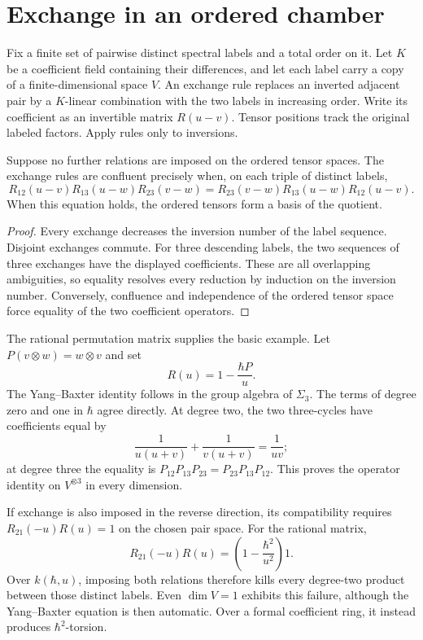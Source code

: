 \section{Exchange in an ordered chamber}

Fix a finite set of pairwise distinct spectral labels and a total order on it.
Let $K$ be a coefficient field containing their differences, and let each label carry a copy of a finite-dimensional space $V$.
An exchange rule replaces an inverted adjacent pair by a $K$-linear combination with the two labels in increasing order.
Write its coefficient as an invertible matrix $R(u-v)$. Tensor positions track the original labeled factors.
Apply rules only to inversions.

\begin{proposition}
\label{prop:alg-exchange}
Suppose no further relations are imposed on the ordered tensor spaces.
The exchange rules are confluent precisely when, on each triple of distinct labels,
\[
 R_{12}(u-v)R_{13}(u-w)R_{23}(v-w)
 =R_{23}(v-w)R_{13}(u-w)R_{12}(u-v).
\]
When this equation holds, the ordered tensors form a basis of the quotient.
\end{proposition}
\begin{proof}
Every exchange decreases the inversion number of the label sequence.
Disjoint exchanges commute.
For three descending labels, the two sequences of three exchanges have the displayed coefficients.
These are all overlapping ambiguities, so equality resolves every reduction by induction on the inversion number.
Conversely, confluence and independence of the ordered tensor space force equality of the two coefficient operators.
\end{proof}

The rational permutation matrix supplies the basic example.
Let $P(v\otimes w)=w\otimes v$ and set
\[
 R(u)=1-\frac{\hbar P}{u}.
\]
The Yang--Baxter identity follows in the group algebra of $\Sigma_3$.
The terms of degree zero and one in $\hbar$ agree directly.
At degree two, the two three-cycles have coefficients equal by
\[
 \frac1{u(u+v)}+\frac1{v(u+v)}=\frac1{uv};
\]
at degree three the equality is
$P_{12}P_{13}P_{23}=P_{23}P_{13}P_{12}$.
This proves the operator identity on $V^{\otimes3}$ in every dimension.

If exchange is also imposed in the reverse direction, its compatibility requires
$R_{21}(-u)R(u)=1$ on the chosen pair space.
For the rational matrix,
\[
 R_{21}(-u)R(u)=\left(1-\frac{\hbar^2}{u^2}\right)1.
\]
Over $k(\hbar,u)$, imposing both relations therefore kills every degree-two product between those distinct labels.
Even $\dim V=1$ exhibits this failure, although the Yang--Baxter equation is then automatic.
Over a formal coefficient ring, it instead produces $\hbar^2$-torsion.

